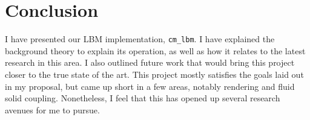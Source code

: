\section{Conclusion}

I have presented our LBM implementation, 
\lstinline{cm_lbm}. I have explained the background theory to 
explain its operation, 
as well as how it relates to the latest research in this area.
I also outlined future work that would bring this project
closer to the true state of the art.
This project mostly satisfies the goals laid out in my proposal,
but came up short in a few areas, notably rendering and 
fluid solid coupling.
Nonetheless, I feel that this has opened up 
several research avenues for me to pursue.

